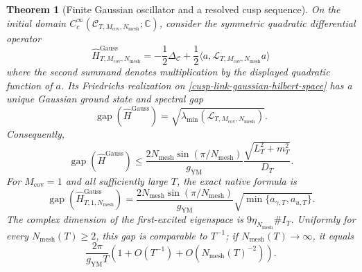 \documentclass[11pt]{article}
\newtheorem{theorem}{Theorem}[section]
\theoremstyle{definition}
\numberwithin{equation}{section}
\begin{document}
\begin{theorem}[Finite Gaussian oscillator and a resolved cusp sequence]
\label{cusp-link-gaussian-theorem}
On the initial domain
\(C_c^\infty(\mathscr C_{T,M_{\mathrm{cov}},N_{\mathrm{mesh}}};\mathbb C)\),
consider the symmetric quadratic differential operator
\begin{equation}
 \widehat H^{\mathrm{Gauss}}_{T,M_{\mathrm{cov}},N_{\mathrm{mesh}}}
 =-\frac12\Delta_{\mathscr C}
  +\frac12\langle a,
     \mathcal L_{T,M_{\mathrm{cov}},N_{\mathrm{mesh}}}a\rangle
 \label{cusp-link-gaussian-hamiltonian}
\end{equation}
where the second summand denotes multiplication by the displayed quadratic
function of \(a\).
Its Friedrichs realization on \eqref{cusp-link-gaussian-hilbert-space} has a
unique Gaussian ground state and spectral gap
\begin{equation}
 \operatorname{gap}(\widehat H^{\mathrm{Gauss}})
 =\sqrt{\lambda_{\min}(
   \mathcal L_{T,M_{\mathrm{cov}},N_{\mathrm{mesh}}})}.
 \label{cusp-link-gaussian-gap}
\end{equation}
Consequently,
\begin{equation}
 \operatorname{gap}(\widehat H^{\mathrm{Gauss}})
 \leq
 \frac{2N_{\mathrm{mesh}}\sin(\pi/N_{\mathrm{mesh}})}{g_{\mathrm{YM}}}
 \frac{\sqrt{L_T^2+m_T^2}}{D_T}.
 \label{cusp-link-gaussian-gap-bound}
\end{equation}
For \(M_{\mathrm{cov}}=1\) and all sufficiently large \(T\), the exact
native formula is
\begin{equation}
 \operatorname{gap}(\widehat H^{\mathrm{Gauss}}_{T,1,N_{\mathrm{mesh}}})
 =\frac{2N_{\mathrm{mesh}}\sin(\pi/N_{\mathrm{mesh}})}{g_{\mathrm{YM}}}
  \sqrt{\min\{a_{\gamma,T},a_{u,T}\}}.
 \label{cusp-link-native-gaussian-gap}
\end{equation}
The complex dimension of the first-excited eigenspace is
\(9\eta_{N_{\mathrm{mesh}}}\#I_T\).  Uniformly for every
\(N_{\mathrm{mesh}}(T)\ge2\), this gap is comparable to \(T^{-1}\); if
\(N_{\mathrm{mesh}}(T)\to\infty\), it equals
\begin{equation}
 \frac{2\pi}{g_{\mathrm{YM}}T}
 \left(1+O(T^{-1})+O(N_{\mathrm{mesh}}(T)^{-2})\right).
 \label{cusp-link-native-gaussian-gap-asymptotic}
\end{equation}


\end{theorem}
\end{document}
